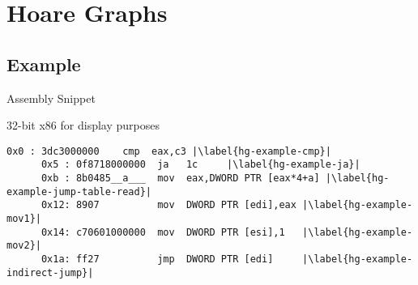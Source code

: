 \section{Hoare Graphs}

\subsection{Example}

\begin{frame}[fragile]{Assembly Snippet}
  \begin{block}{32-bit \gls{x86} for display purposes}
    \begin{lstlisting}[style=x64,gobble=6]
      0x0 : 3dc3000000    cmp  eax,c3 |\label{hg-example-cmp}|
      0x5 : 0f8718000000  ja   1c     |\label{hg-example-ja}|
      0xb : 8b0485__a___  mov  eax,DWORD PTR [eax*4+a] |\label{hg-example-jump-table-read}|
      0x12: 8907          mov  DWORD PTR [edi],eax |\label{hg-example-mov1}|
      0x14: c70601000000  mov  DWORD PTR [esi],1   |\label{hg-example-mov2}|
      0x1a: ff27          jmp  DWORD PTR [edi]     |\label{hg-example-indirect-jump}|
    \end{lstlisting}
  \end{block}
\end{frame}


